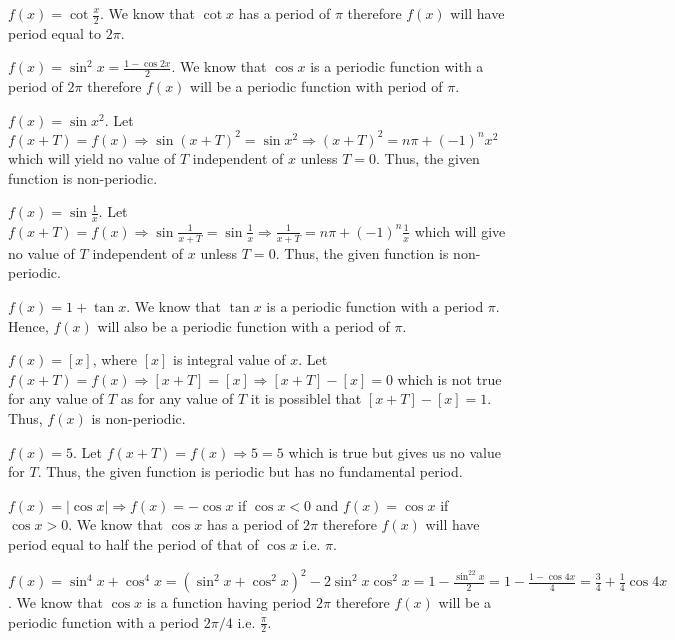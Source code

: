 \item $f(x) = \cot\frac{x}{2}$. We know that $\cot x$ has a period of $\pi$ therefore
  $f(x)$ will have period equal to $2\pi$.

\item $f(x) = \sin^2x = \frac{1 - \cos 2x}{2}$. We know that $\cos x$ is a periodic function
  with a period of $2\pi$ therefore $f(x)$ will be a periodic function with period of
  $\pi$.

\item $f(x) = \sin x^2$. Let $f(x + T) = f(x) \Rightarrow \sin(x + T)^2 = \sin x^2 \Rightarrow
  (x + T)^2 = n\pi + (-1)^nx^2$ which will yield no value of $T$ independent of $x$ unless
  $T = 0$. Thus, the given function is non-periodic.

\item $f(x) = \sin\frac{1}{x}$. Let $f(x + T) = f(x) \Rightarrow \sin\frac{1}{x + T} =
  \sin\frac{1}{x} \Rightarrow \frac{1}{x + T} = n\pi + (-1)^n\frac{1}{x}$ which will give no value of
  $T$ independent of $x$ unless $T = 0$. Thus, the given function is non-periodic.

\item $f(x) = 1 + \tan x$. We know that $\tan x$ is a periodic function with a period
  $\pi$. Hence, $f(x)$ will also be a periodic function with a period of $\pi$.

\item $f(x) = [x]$, where $[x]$ is integral value of $x$. Let $f(x + T) = f(x)
  \Rightarrow [x + T] = [x] \Rightarrow [x + T] - [x] = 0$ which is not true for any value of
  $T$ as for any value of $T$ it is possiblel that $[x + T] - [x] = 1$. Thus,
  $f(x)$ is non-periodic.

\item $f(x) = 5$. Let $f(x + T) = f(x) \Rightarrow 5 = 5$ which is true but gives us no value
  for $T$. Thus, the given function is periodic but has no fundamental period.

\item $f(x) = |\cos x| \Rightarrow f(x) = -\cos x$ if $\cos x < 0$ and $f(x) = \cos x$ if
  $\cos x > 0$. We know that $\cos x$ has a period of $2\pi$ therefore $f(x)$
  will have period equal to half the period of that of $\cos x$ i.e. $\pi$.

\item $f(x) = \sin^4x + \cos^4x = (\sin^2x + \cos^2x)^2 - 2\sin^2x\cos^2x = 1 - \frac{\sin^22x}{2} =
  1 - \frac{1 - \cos4x}{4} = \frac{3}{4} + \frac{1}{4}\cos4x$. We know that $\cos x$ is a
  function having period $2\pi$ therefore $f(x)$ will be a periodic function with a period
  $2\pi/4$ i.e. $\frac{\pi}{2}$.

